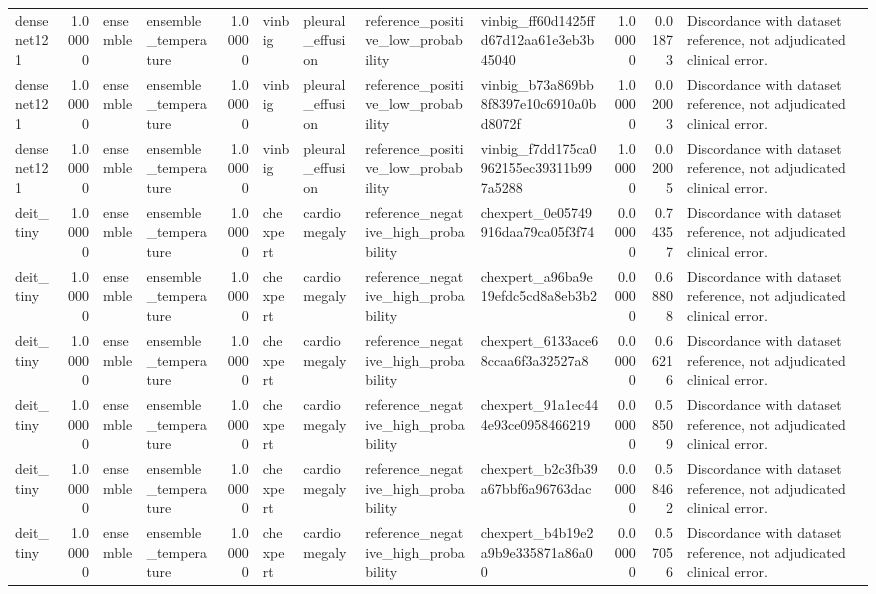 \begin{tabular}{lrllrllllrrl}
densenet121 & 1.00000 & ensemble & ensemble\_temperature & 1.00000 & vinbig & pleural\_effusion & reference\_positive\_low\_probability & vinbig\_ff60d1425ffd67d12aa61e3eb3b45040 & 1.00000 & 0.01873 & Discordance with dataset reference, not adjudicated clinical error. \\
densenet121 & 1.00000 & ensemble & ensemble\_temperature & 1.00000 & vinbig & pleural\_effusion & reference\_positive\_low\_probability & vinbig\_b73a869bb8f8397e10c6910a0bd8072f & 1.00000 & 0.02003 & Discordance with dataset reference, not adjudicated clinical error. \\
densenet121 & 1.00000 & ensemble & ensemble\_temperature & 1.00000 & vinbig & pleural\_effusion & reference\_positive\_low\_probability & vinbig\_f7dd175ca0962155ec39311b997a5288 & 1.00000 & 0.02005 & Discordance with dataset reference, not adjudicated clinical error. \\
deit\_tiny & 1.00000 & ensemble & ensemble\_temperature & 1.00000 & chexpert & cardiomegaly & reference\_negative\_high\_probability & chexpert\_0e05749916daa79ca05f3f74 & 0.00000 & 0.74357 & Discordance with dataset reference, not adjudicated clinical error. \\
deit\_tiny & 1.00000 & ensemble & ensemble\_temperature & 1.00000 & chexpert & cardiomegaly & reference\_negative\_high\_probability & chexpert\_a96ba9e19efdc5cd8a8eb3b2 & 0.00000 & 0.68808 & Discordance with dataset reference, not adjudicated clinical error. \\
deit\_tiny & 1.00000 & ensemble & ensemble\_temperature & 1.00000 & chexpert & cardiomegaly & reference\_negative\_high\_probability & chexpert\_6133ace68ccaa6f3a32527a8 & 0.00000 & 0.66216 & Discordance with dataset reference, not adjudicated clinical error. \\
deit\_tiny & 1.00000 & ensemble & ensemble\_temperature & 1.00000 & chexpert & cardiomegaly & reference\_negative\_high\_probability & chexpert\_91a1ec444e93ce0958466219 & 0.00000 & 0.58509 & Discordance with dataset reference, not adjudicated clinical error. \\
deit\_tiny & 1.00000 & ensemble & ensemble\_temperature & 1.00000 & chexpert & cardiomegaly & reference\_negative\_high\_probability & chexpert\_b2c3fb39a67bbf6a96763dac & 0.00000 & 0.58462 & Discordance with dataset reference, not adjudicated clinical error. \\
deit\_tiny & 1.00000 & ensemble & ensemble\_temperature & 1.00000 & chexpert & cardiomegaly & reference\_negative\_high\_probability & chexpert\_b4b19e2a9b9e335871a86a00 & 0.00000 & 0.57056 & Discordance with dataset reference, not adjudicated clinical error. \\

\end{tabular}
